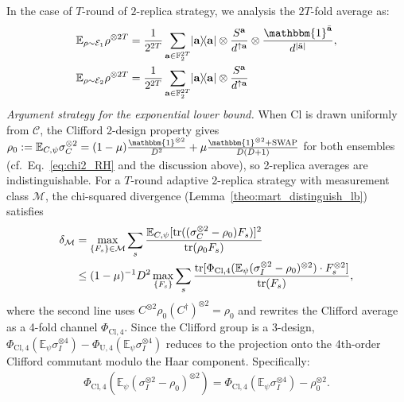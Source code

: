 \documentclass[aps,%
twocolumn,%
floatfix,%
pra,%
amsfonts,%
groupedaddress,%
superscriptaddress]{revtex4-2}%
\newcommand{\bra}[1]{\langle #1\rvert}
\newcommand{\ket}[1]{\lvert #1\rangle}
\newcommand{\1}{\mathbbm{1}}
\begin{document}
In the case of $T$-round of $2$-replica strategy, we analysis the $2T$-fold average as:
\begin{align}
    \mathbb{E}_{\rho \sim \mathcal{E}_1}\rho^{\otimes 2T} &= \frac{1}{2^{2T}} \sum_{\mathbf{a} \in \mathbb{F}_2^{2T}}\ket{\mathbf{a}}\!\bra{\mathbf{a}} \otimes  \frac{S^{\mathbf{a}}}{d^{\uparrow \mathbf{a}}} \otimes \frac{\1^{\bar{\mathbf{a}}}}{d^{|\bar {\mathbf{a}}|}},\\
    \mathbb{E}_{\rho \sim \mathcal{E}_2}\rho^{\otimes 2T} &= \frac{1}{2^{2T}} \sum_{\mathbf{a} \in \mathbb{F}_2^{2T}} \ket{\mathbf{a}}\!\bra{\mathbf{a}} \otimes \frac{S^{\mathbf{a}}}{d^{\uparrow \mathbf{a}}}
\end{align}
\color{red}
\emph{Argument strategy for the exponential lower bound.}
When $\mathrm{Cl}$ is drawn uniformly from $\mathcal{C}$, the Clifford 2-design property gives
$\rho_0 := \mathbb{E}_{C,\psi}\sigma_{C}^{\otimes 2} = (1-\mu)\frac{\1^{\otimes 2}}{D^2} + \mu \frac{\1^{\otimes 2}+\mathrm{SWAP}}{D(D+1)}$
for both ensembles (cf.\ Eq.~\eqref{eq:chi2_RH} and the discussion above), so 2-replica averages are indistinguishable.
For a $T$-round adaptive 2-replica strategy with measurement class $\mathcal{M}$, the chi-squared divergence (Lemma~\ref{theo:mart_distinguish_lb}) satisfies
\begin{align}
    \delta_{\mathcal{M}} &= \max_{\{F_s\} \in \mathcal{M}} \sum_s \frac{\mathbb{E}_{C,\psi}[\mathrm{tr}((\sigma_C^{\otimes 2} - \rho_0)F_s)]^2}{\mathrm{tr}(\rho_0 F_s)} \notag\\
    &\leq (1-\mu)^{-1} D^2 \max_{\{F_s\}} \sum_s \frac{\mathrm{tr}[\Phi_{\mathrm{Cl},4}(\mathbb{E}_\psi (\sigma_I^{\otimes 2} - \rho_0)^{\otimes 2}) \cdot F_s^{\otimes 2}]}{\mathrm{tr}(F_s)},
\end{align}
where the second line uses $C^{\otimes 2}\rho_0(C^\dagger)^{\otimes 2} = \rho_0$ and rewrites the Clifford average as a 4-fold channel $\Phi_{\mathrm{Cl},4}$.
Since the Clifford group is a 3-design, $\Phi_{\mathrm{Cl},4}(\mathbb{E}_\psi \sigma_I^{\otimes 4}) - \Phi_{\mathrm{U},4}(\mathbb{E}_\psi \sigma_I^{\otimes 4})$ reduces to the projection onto the 4th-order Clifford commutant modulo the Haar component. Specifically:
\begin{align}
    \Phi_{\mathrm{Cl},4}(\mathbb{E}_\psi(\sigma_I^{\otimes 2}-\rho_0)^{\otimes 2}) = \Phi_{\mathrm{Cl},4}(\mathbb{E}_\psi \sigma_I^{\otimes 4}) - \rho_0^{\otimes 2}.
\end{align}
\end{document}
